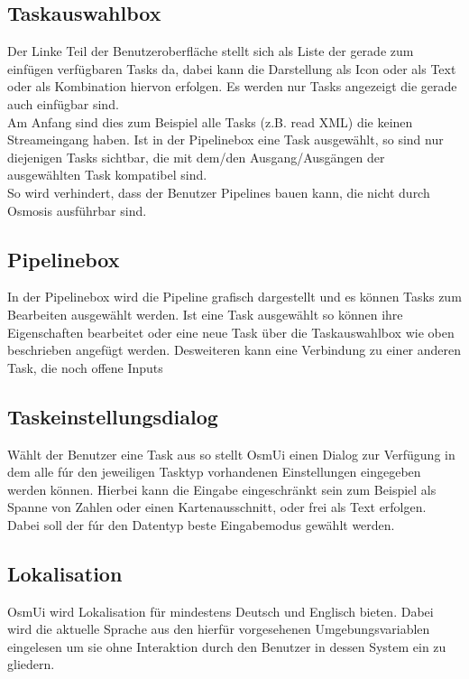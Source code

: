 \documentclass[a4paper,10pt]{scrartcl}
\begin{document}
\subsection{Taskauswahlbox}
Der Linke Teil der Benutzeroberfläche stellt sich als Liste der gerade zum einfügen verfügbaren Tasks da, dabei kann die Darstellung als Icon oder als Text oder 
als Kombination hiervon erfolgen. Es werden nur Tasks angezeigt die gerade auch einfügbar sind. \\
Am Anfang sind dies zum Beispiel alle Tasks (z.B. read XML) die keinen Streameingang haben. Ist in der Pipelinebox eine Task ausgewählt, so
sind nur diejenigen Tasks sichtbar, die mit dem/den Ausgang/Ausgängen der ausgewählten Task kompatibel sind.\\
So wird verhindert, dass der Benutzer Pipelines bauen kann, die nicht durch Osmosis ausführbar sind.
\subsection{Pipelinebox}
In der Pipelinebox wird die Pipeline grafisch dargestellt und es können Tasks zum Bearbeiten ausgewählt werden. Ist eine Task ausgewählt so können ihre Eigenschaften
bearbeitet oder eine neue Task über die Taskauswahlbox wie oben beschrieben angefügt werden. Desweiteren kann eine Verbindung zu einer anderen Task, die noch offene
Inputs
\subsection{Taskeinstellungsdialog}
Wählt der Benutzer eine Task aus so stellt OsmUi einen Dialog zur Verfügung in dem alle fúr den jeweiligen Tasktyp vorhandenen Einstellungen eingegeben werden können.
Hierbei kann die Eingabe eingeschränkt sein zum Beispiel als Spanne von Zahlen oder einen Kartenausschnitt, oder frei als Text erfolgen. Dabei soll der fúr
den Datentyp beste Eingabemodus gewählt werden.
\subsection{Lokalisation}
OsmUi wird Lokalisation für mindestens Deutsch und Englisch bieten. Dabei wird die aktuelle Sprache aus den hierfür vorgesehenen Umgebungsvariablen eingelesen um
sie ohne Interaktion durch den Benutzer in dessen System ein zu gliedern.
\end{document}
